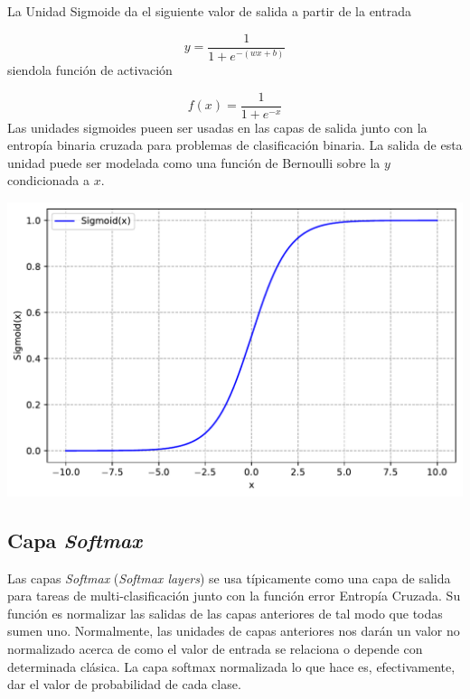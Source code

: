 \begin{minipage}{0.45\linewidth}
    La Unidad Sigmoide da el siguiente valor de salida a partir de la entrada

    \begin{equation}
        y = \frac{1}{1+e^{-(w x + b)}}
    \end{equation}
    siendola función de activación

    \begin{equation}
        f(x) = \frac{1}{1+e^{-x}}
    \end{equation}
    Las unidades sigmoides pueen ser usadas en las capas de salida junto con la entropía binaria cruzada para problemas de clasificación binaria. La salida de esta unidad puede ser modelada como una función de Bernoulli sobre la $y$ condicionada a $x$. 
\end{minipage} \hfill
\begin{minipage}{0.52\linewidth}
    \centering
    \includegraphics[width=1\linewidth]{Imagenes/03/Sigmoide.pdf}
\end{minipage}

\subsection{Capa \textit{Softmax}}

Las capas \textit{Softmax} (\textit{Softmax layers}) se usa típicamente como una capa de salida para tareas de multi-clasificación junto con la función error Entropía Cruzada. Su función es normalizar las salidas de las capas anteriores de tal modo que todas sumen uno. Normalmente, las unidades de capas anteriores nos darán un valor no normalizado acerca de como el valor de entrada se relaciona o depende con determinada clásica. La capa softmax normalizada lo que hace es, efectivamente, dar el valor de probabilidad de cada clase. 



